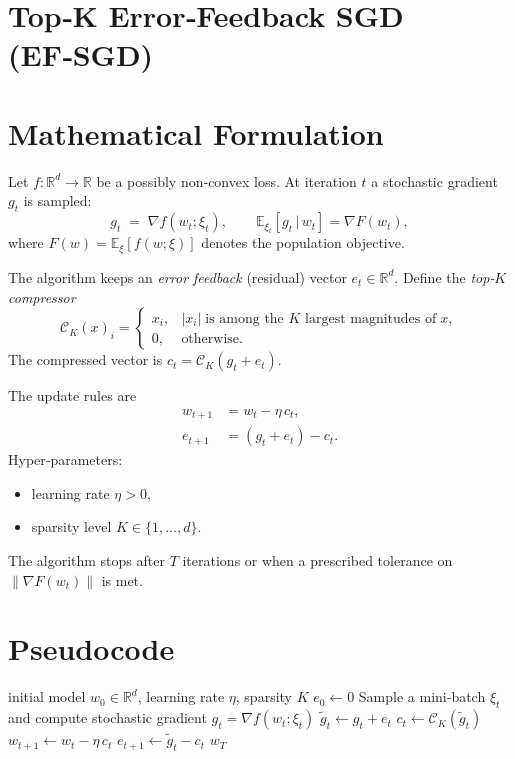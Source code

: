 \documentclass{article}
\newcommand{\E}{\mathbb{E}}
\newcommand{\R}{\mathbb{R}}
\newcommand{\norm}[1]{\left\lVert #1 \right\rVert}
\newcommand{\topk}{\mathcal{C}_K}
\begin{document}
\section*{Top‑K Error‑Feedback SGD (EF‑SGD)}

\section*{Mathematical Formulation}
Let $f:\R^{d}\rightarrow\R$ be a possibly non‑convex loss.  
At iteration $t$ a stochastic gradient $g_t$ is sampled:
\[
g_t \;=\; \nabla f(w_t;\xi_t),\qquad \E_{\xi_t}[g_t\,|\,w_t]=\nabla F(w_t), 
\]
where $F(w)=\E_{\xi}[f(w;\xi)]$ denotes the population objective.  

The algorithm keeps an \emph{error feedback} (residual) vector $e_t\in\R^{d}$.
Define the \emph{top‑$K$ compressor}
\[
\topk(x)_i = 
\begin{cases}
x_i, & |x_i|\;\text{is among the $K$ largest magnitudes of}\;x,\\[2mm]
0,   & \text{otherwise}.
\end{cases}
\]
The compressed vector is $c_t=\topk(g_t+e_t)$.  

The update rules are
\begin{align}
w_{t+1} &= w_t-\eta\,c_t, \label{eq:w_update}\\[2mm]
e_{t+1} &= (g_t+e_t)-c_t. \label{eq:e_update}
\end{align}
Hyper‑parameters:
\begin{itemize}[noitemsep]
\item learning rate $\eta>0$,
\item sparsity level $K\in\{1,\dots,d\}$.
\end{itemize}
The algorithm stops after $T$ iterations or when a prescribed tolerance on $\norm{\nabla F(w_t)}$ is met.

\section*{Pseudocode}
\begin{algorithm}[H]
\caption{Top‑K Error‑Feedback SGD}
\begin{algorithmic}[1]
\Require initial model $w_0\in\R^{d}$, learning rate $\eta$, sparsity $K$
\State $e_0\gets 0$ 
    \State Sample a mini‑batch $\xi_t$ and compute stochastic gradient $g_t=\nabla f(w_t;\xi_t)$
    \State $\tilde g_t \gets g_t+e_t$ 
    \State $c_t \gets \topk(\tilde g_t)$ 
    \State $w_{t+1} \gets w_t - \eta\,c_t$ 
    \State $e_{t+1} \gets \tilde g_t - c_t$ 
\EndFor
\State \Return $w_T$
\end{algorithmic}
\end{algorithm}
\end{document}
